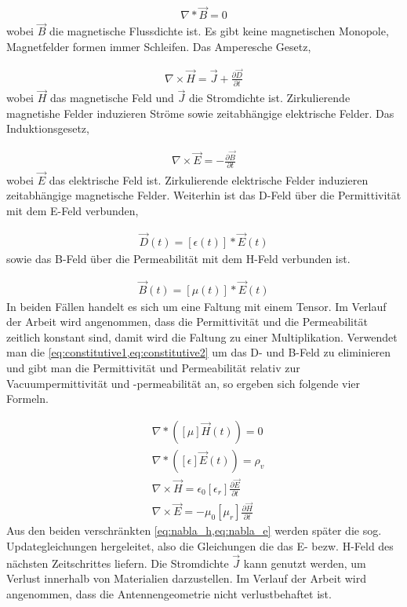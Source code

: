 \documentclass[11pt, ngerman]{article}
\begin{document}
\begin{align}
	\nabla * \vec{B} = 0
	\label{eq:gausz_law_h}
\end{align}
wobei \(\vec{B}\) die magnetische Flussdichte ist.
Es gibt keine magnetischen Monopole, Magnetfelder formen immer Schleifen.
Das Amperesche Gesetz\cite{amperes_law},

\begin{align}
	\nabla\times\vec{H} = \vec{J} + \frac{\partial\vec{D}}{\partial t}
\end{align}
wobei \(\vec{H}\) das magnetische Feld und \(\vec{J}\) die Stromdichte ist.
Zirkulierende magnetishe Felder induzieren Str\"ome sowie zeitabh\"angige
elektrische Felder. Das Induktionsgesetz\cite{induction_law},

\begin{align}
	\nabla\times\vec{E} = -\frac{\partial\vec{B}}{\partial t}
\end{align}
wobei \(\vec{E}\) das elektrische Feld ist.
Zirkulierende elektrische Felder induzieren zeitabh\"angige magnetische Felder.
Weiterhin ist das D-Feld \"uber die Permittivit\"at mit dem E-Feld verbunden,\cite{constitutive}

\begin{align}
	\vec{D}(t) = [\epsilon(t)] * \vec{E}(t)
	\label{eq:constitutive1}
\end{align}
sowie das B-Feld \"uber die Permeabilit\"at mit dem H-Feld verbunden ist.\cite{constitutive}

\begin{align}
	\vec{B}(t) = [\mu(t)] * \vec{E}(t)
	\label{eq:constitutive2}
\end{align}
In beiden F\"allen handelt es sich um eine Faltung mit einem Tensor.
Im Verlauf der Arbeit wird angenommen, dass die Permittivit\"at und die Permeabilit\"at zeitlich
konstant sind, damit wird die Faltung zu einer Multiplikation. Verwendet man die
\cref{eq:constitutive1,eq:constitutive2} um das D- und B-Feld zu eliminieren und
gibt man die Permittivit\"at und Permeabilit\"at relativ zur Vacuumpermittivit\"at und
-permeabilit\"at an, so ergeben sich folgende vier Formeln.

\begin{align}
	&\nabla * ([\mu]\vec{H}(t)) = 0 \\
	&\nabla * ([\epsilon]\vec{E}(t)) = \rho_v \\
	&\nabla\times\vec{H} = \epsilon_0[\epsilon_r]\frac{\partial\vec{E}}{\partial t} \label{eq:nabla_h} \\
	&\nabla\times\vec{E} = -\mu_0[\mu_r]\frac{\partial\vec{H}}{\partial t} \label{eq:nabla_e}
\end{align}
Aus den beiden verschr\"ankten \cref{eq:nabla_h,eq:nabla_e} werden sp\"ater die sog.
Updategleichungen hergeleitet, also die Gleichungen die das E- bezw. H-Feld des n\"achsten
Zeitschrittes liefern. Die Stromdichte \(\vec{J}\) kann genutzt werden, um
Verlust innerhalb von Materialien darzustellen. Im Verlauf der Arbeit wird angenommen,
dass die Antennengeometrie nicht verlustbehaftet ist.
\end{document}
